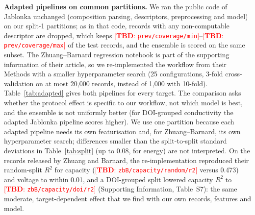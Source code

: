 \documentclass[journal=jcisd8,manuscript=article,layout=traditional]{achemso}
\newcommand{\TBD}[1]{\textcolor{red}{[\textbf{TBD}: \nolinkurl{#1}]}}
\begin{document}
\textbf{Adapted pipelines on common partitions.} We ran the public code of Jablonka unchanged (composition parsing, descriptors, preprocessing and model) on our split-1 partitions; as in that code, records with any non-computable descriptor are dropped, which keeps \TBD{prev/coverage/min}--\TBD{prev/coverage/max} of the test records, and the ensemble is scored on the same subset. The Zhuang--Barnard regression notebook is part of the supporting information of their article, so we re-implemented the workflow from their Methods with a smaller hyperparameter search (25 configurations, 3-fold cross-validation on at most 20,000 records, instead of 1,000 with 10-fold). Table~\ref{tab:adapted} gives both pipelines for every target. The comparison asks whether the protocol effect is specific to our workflow, not which model is best, and the ensemble is not uniformly better (for DOI-grouped conductivity the adapted Jablonka pipeline scores higher). We use one partition because each adapted pipeline needs its own featurisation and, for Zhuang--Barnard, its own hyperparameter search; differences smaller than the split-to-split standard deviations in Table~\ref{tab:split} (up to 0.08, for energy) are not interpreted. On the records released by Zhuang and Barnard, the re-implementation reproduced their random-split $R^2$ for capacity (\TBD{zbB/capacity/random/r2} versus 0.473) and voltage to within 0.01, and a DOI-grouped split lowered capacity $R^2$ to \TBD{zbB/capacity/doi/r2} (Supporting Information, Table~S7): the same moderate, target-dependent effect that we find with our own records, features and model.
\end{document}
